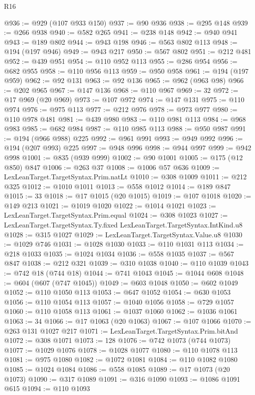 \begin{lexlean}{R16}
\begin{coremodule}
@936 := @929 (@107 @933 @150)
@937 := @90 @936
@938 := @295 @148
@939 := @266 @938
@940 := @582 @265
@941 := @238 @148
@942 := @940 @941
@943 := @189 @802
@944 := @943 @198
@946 := @563 @802 @113
@948 := @194 (@197 @946)
@949 := @943 @217
@950 := @567 @802
@951 := @212 @481
@952 := @439 @951
@954 := @110 @952 @113
@955 := @286 @954
@956 := @682 @955
@958 := @110 @956 @113
@959 := @950 @958
@961 := @194 (@197 @959)
@962 := @92 @131
@963 := @92 @136
@965 := @962 (@963 @98)
@966 := @202 @965
@967 := @147 @136
@968 := @110 @967
@969 := 32
@972 := @17 @969 (@20 @969)
@973 := @107 @972
@974 := @147 @131
@975 := @110 @974
@976 := @975 @113
@977 := @212 @976
@978 := @973 @977
@980 := @110 @978 @481
@981 := @439 @980
@983 := @110 @981 @113
@984 := @968 @983
@985 := @682 @984
@987 := @110 @985 @113
@988 := @950 @987
@991 := @194 (@966 @988) @225
@992 := @961 @991
@993 := @949 @992
@996 := @194 (@207 @993) @225
@997 := @948 @996
@998 := @944 @997
@999 := @942 @998
@1001 := @835 (@939 @999)
@1002 := @90 @1001
@1005 := @175 (@12 @850) @847
@1006 := @263 @37
@1008 := @1006 @57 @636
@1009 := LexLeanTarget.TargetSyntax.Prim.natLt
@1010 := @308 @1009
@1011 := @212 @325
@1012 := @1010 @1011
@1013 := @558 @1012
@1014 := @189 @847
@1015 := 33
@1018 := @17 @1015 (@20 @1015)
@1019 := @107 @1018
@1020 := @149 @213
@1021 := @1019 @1020
@1022 := @1014 @1021
@1023 := LexLeanTarget.TargetSyntax.Prim.equal
@1024 := @308 @1023
@1027 := LexLeanTarget.TargetSyntax.Ty.fixed LexLeanTarget.TargetSyntax.IntKind.u8
@1028 := @315 @1027
@1029 := LexLeanTarget.TargetSyntax.Value.u8
@1030 := @1029 @746
@1031 := @1028 @1030
@1033 := @110 @1031 @113
@1034 := @218 @1033
@1035 := @1024 @1034
@1036 := @558 @1035
@1037 := @567 @847
@1038 := @212 @321
@1039 := @310 @1038
@1040 := @110 @1039
@1043 := @742 @18 (@744 @18)
@1044 := @741 @1043
@1045 := @1044 @608
@1048 := @604 (@607 (@747 @1045))
@1049 := @603 @1048
@1050 := @602 @1049
@1052 := @110 @1050 @113
@1053 := @647 @1052
@1054 := @630 @1053
@1056 := @110 @1054 @113
@1057 := @1040 @1056
@1058 := @729 @1057
@1060 := @110 @1058 @113
@1061 := @1037 @1060
@1062 := @1036 @1061
@1063 := 34
@1066 := @17 @1063 (@20 @1063)
@1067 := @107 @1066
@1070 := @263 @131 @1027 @217
@1071 := LexLeanTarget.TargetSyntax.Prim.bitAnd
@1072 := @308 @1071
@1073 := 128
@1076 := @742 @1073 (@744 @1073)
@1077 := @1029 @1076
@1078 := @1028 @1077
@1080 := @110 @1078 @113
@1081 := @975 @1080
@1082 := @1072 @1081
@1084 := @110 @1082 @1080
@1085 := @1024 @1084
@1086 := @558 @1085
@1089 := @17 @1073 (@20 @1073)
@1090 := @317 @1089
@1091 := @316 @1090
@1093 := @1086 @1091 @615
@1094 := @110 @1093

\end{coremodule}
\end{lexlean}
